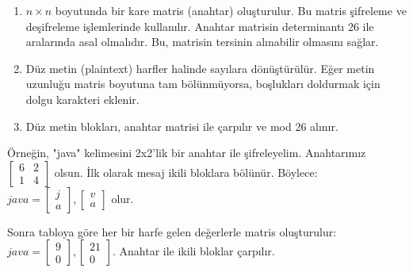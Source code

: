 \begin{enumerate}
    \item $n \times n$ boyutunda bir kare matris (anahtar) oluşturulur. Bu matris şifreleme ve deşifreleme işlemlerinde kullanılır. Anahtar matrisin determinantı 26 ile aralarında asal olmalıdır. Bu, matrisin tersinin alınabilir olmasını sağlar.
    \item Düz metin (plaintext) harfler halinde sayılara dönüştürülür. Eğer metin uzunluğu matris boyutuna tam bölünmüyorsa, boşlukları doldurmak için dolgu karakteri eklenir.
    \item Düz metin blokları, anahtar matrisi ile çarpılır ve mod 26 alınır.
\end{enumerate}

Örneğin, "java" kelimesini 2x2'lik bir anahtar ile şifreleyelim. Anahtarımız $\begin{bmatrix} 6 & 2 \\ 1 & 4 \end{bmatrix}$ olsun. İlk olarak mesaj ikili bloklara bölünür. Böylece: $java = \begin{bmatrix} j \\ a \end{bmatrix} , \begin{bmatrix} v \\ a \end{bmatrix}$ olur. 

\begin{table}[ht]
\centering
{}
\end{table}

\newpage

Sonra tabloya göre her bir harfe gelen değerlerle matris oluşturulur: $java = \begin{bmatrix} 9 \\ 0 \end{bmatrix} , \begin{bmatrix} 21 \\ 0 \end{bmatrix}$. Anahtar ile ikili bloklar çarpılır. 

